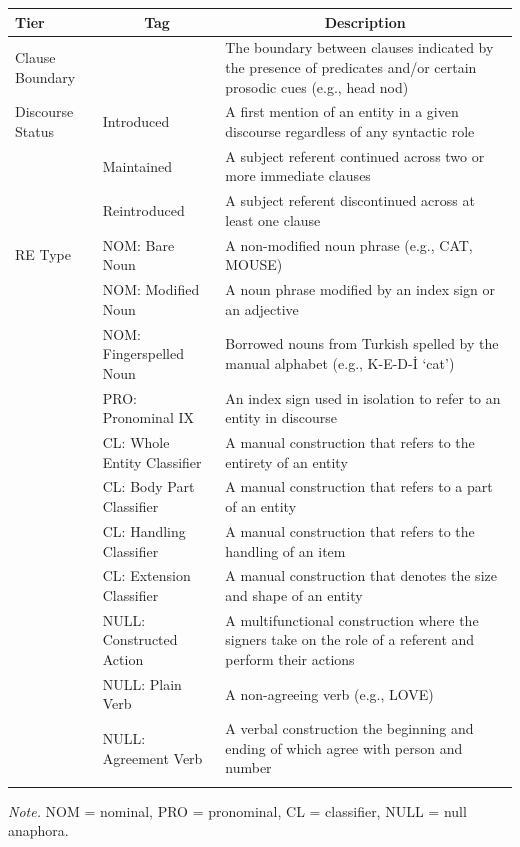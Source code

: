 \documentclass[]{elsarticle} %
\begin{document}
\begin{table}[p]
\begin{center}
\begin{threeparttable}
{\begin{tabular}{p{3.2cm}p{3.8cm}p{3.8cm}}
\toprule
Tier & \multicolumn{1}{c}{Tag} & \multicolumn{1}{c}{Description}\\
\midrule
Clause Boundary &  & The boundary between clauses indicated by the presence of predicates and/or certain prosodic cues (e.g., head nod)\\
Discourse Status & Introduced & A first mention of an entity in a given discourse regardless of any syntactic role\\
 & Maintained & A subject referent continued across two or more immediate clauses\\
 & Reintroduced & A subject referent discontinued across at least one clause\\
RE Type & NOM: Bare Noun & A non-modified noun phrase (e.g., CAT, MOUSE)\\
 & NOM: Modified Noun & A noun phrase modified by an index sign or an adjective\\
 & NOM: Fingerspelled Noun & Borrowed nouns from Turkish spelled by the manual alphabet (e.g., K-E-D-İ ‘cat’)\\
 & PRO: Pronominal IX & An index sign used in isolation to refer to an entity in discourse\\
 & CL: Whole Entity Classifier & A manual construction that refers to the entirety of an entity\\
 & CL: Body Part Classifier & A manual construction that refers to a part of an entity\\
 & CL: Handling Classifier & A manual construction that refers to the handling of an item\\
 & CL: Extension Classifier & A manual construction that denotes the size and shape of an entity\\
 & NULL: Constructed Action & A multifunctional construction where the signers take on the role of a referent and perform their actions\\
 & NULL: Plain Verb & A non-agreeing verb (e.g., LOVE)\\
 & NULL: Agreement Verb & A verbal construction the beginning and ending of which agree with person and number\\
\bottomrule
\addlinespace
\end{tabular}

}

\begin{tablenotes}[para]
\normalsize{\textit{Note.} NOM = nominal, PRO = pronominal, CL = classifier, NULL = null anaphora.}
\end{tablenotes}

\end{threeparttable}
\end{center}

\end{table}
\end{document}
